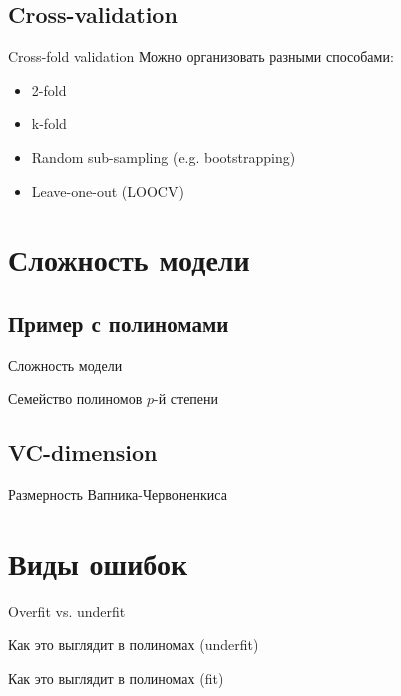 \documentclass[14pt, fleqn, xcolor={dvipsnames, table}]{beamer}
\begin{document}
\subsection{Cross-validation}

\begin{frame}{Cross-fold validation}
Можно организовать разными способами:
\begin{itemize}
  \item 2-fold
  \item k-fold
  \item Random sub-sampling (e.g. bootstrapping) 
  \item Leave-one-out (LOOCV)
\end{itemize}
\end{frame}
\section{Сложность модели}
\subsection{Пример с полиномами}

\begin{frame}{Сложность модели}
\end{frame}

\begin{frame}{Семейство полиномов $p$-й степени}
\end{frame}

\subsection{VC-dimension}
\begin{frame}{Размерность Вапника-Червоненкиса}
\end{frame}

\section{Виды ошибок}
\begin{frame}{Overfit vs. underfit}
\end{frame}

\begin{frame}{Как это выглядит в полиномах (underfit)}
\end{frame}

\begin{frame}{Как это выглядит в полиномах (fit)}
\end{frame}
\end{document}
